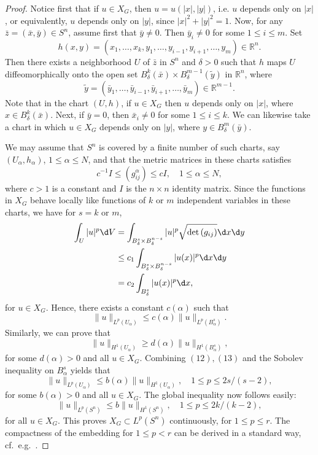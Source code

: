 \documentclass[11pt]{article}
\begin{document}
\begin{proof}
  Notice first that if $u \in X_G$, then $u=u(|x|,|y|)$, i.e.\! $u$ depends only on $|x|$,
  or equivalently, $u$ depends only on $|y|$, since $|x|^2+|y|^2=1$.
  Now, for any $\bar{z}=(\bar{x}, \bar{y}) \in S^n$, assume first that $\bar{y} \neq 0$.
  Then $\bar{y}_i \neq 0$ for some $1 \leq i \leq m$. Set
  \[
  h(x, y)=\left(x_1, \ldots, x_k, y_1, \ldots, y_{i-1}, y_{i+1}, \ldots, y_m\right) \in \mathbb{R}^n .
  \]
  Then there exists a neighborhood $U$ of $\bar{z}$ in $S^n$ and $\delta>0$ such that $h$ maps $U$ diffeomorphically onto the open set $B_\delta^k(\bar{x}) \times B_\delta^{m-1}(\tilde{y})$ in $\mathbb{R}^n$, where
  \[
  \tilde{y} = \left(\bar{y}_1, \ldots, \bar{y}_{i-1}, \bar{y}_{i+1}, \ldots, \bar{y}_m\right) \in \mathbb{R}^{m-1}.
  \]
  Note that in the chart $(U, h)$, if $u \in X_G$ then $u$ depends only on $|x|$, where $x \in B_\delta^k(\bar{x})$. Next, if $\bar{y}=0$, then $\bar{x}_i \neq 0$ for some $1 \leq i \leq k$. We can likewise take a chart in which $u \in X_G$ depends only on $|y|$, where $y \in B_\delta^m(\bar{y})$.

  We may assume that $S^n$ is covered by a finite number of such charts,
  say $\left(U_\alpha, h_\alpha\right)$, $1 \leq \alpha \leq N$,
  and that the metric matrices in these charts satisfies
  \[
  c^{-1} I \leq\left(g_{i j}^\alpha\right) \leq c I, \quad 1 \leq \alpha \leq N,
  \]
  where $c>1$ is a constant and $I$ is the $n \times n$ identity matrix. Since the functions in $X_G$ behave locally like functions of $k$ or $m$ independent variables in these charts, we have for $s=k$ or $m$,
  \[
  \begin{aligned}
    \int_U|u|^p \d V 
    & = \int_{B_\delta^s \times B_\delta^{n-s}}|u|^p 
      \sqrt{\det\left(g_{i j}\right)} \d x \d y \\
    & \leq c_1 \int_{B_\delta^s \times B_\delta^{n-s}}|u(x)|^p \d x \d y \\
    & =c_2 \int_{B_\delta^s}|u(x)|^p \d x,
  \end{aligned}
  \]
  for $u \in X_G$. Hence, there exists a constant $c(\alpha)$ such that
  \begin{equation}\label{eq:12}
    \|u\|_{L^p(U_\alpha)} \leq c(\alpha)\|u\|_{L^p(B_\alpha^s)}.  
  \end{equation}
  Similarly, we can prove that
  \begin{equation}\label{eq:13}
    \|u\|_{H^1(U_\alpha)} \geq d(\alpha)\|u\|_{H^1(B_\alpha^s)},  
  \end{equation}
  for some $d(\alpha)>0$ and all $u \in X_G$. Combining $(12),(13)$ and the Sobolev inequality on $B_\alpha^s$ yields that
  \[
  \|u\|_{L^p(U_\alpha)} \leq b(\alpha)\|u\|_{H^1(U_\alpha)}, \quad 1 \leq p \leq 2 s /(s-2),
  \]
  for some $b(\alpha)>0$ and all $u \in X_G$. The global inequality now follows easily:
  \[
  \|u\|_{L^p\left(S^n\right)} \leq b\|u\|_{H^1(S^n)}, \quad 1 \leq p \leq 2 k /(k-2),
  \]
  for all $u \in X_G$. This proves $X_G \subset L^p\left(S^n\right)$ continuously,
  for $1 \leq p \leq r$. The compactness of the embedding for $1 \leq p<r$ can
  be derived in a standard way, cf.~e.g.~\cite{aubin1982monge}.
\end{proof}
\end{document}
